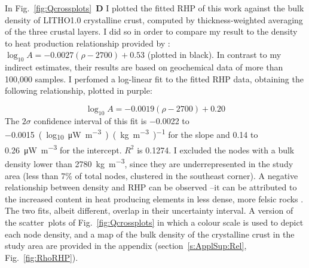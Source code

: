 In Fig.~\ref{fig:Qcrossplots}~\textbf{D} I plotted the fitted RHP of this work against the bulk density of LITHO1.0 \parencite{Pasyanos2014} crystalline crust, computed by thickness-weighted averaging of the three crustal layers.
I did so in order to compare my result to the density to heat production relationship provided by \textcite{Hasterok2017_ign}: $\log_{10} A = -0.0027 (\rho - 2700) + 0.53 $ (plotted in black).
In contrast to my indirect estimates, their results are based on geochemical data of more than {100,000} samples.
I perfomed a log-linear fit to the fitted RHP data, obtaining the following relationship, plotted in purple:

\begin{equation}
	\label{eq:RHP_RHO_fit}
	\log_{10} A = -0.0019 (\rho - 2700) + 0.20
\end{equation}
The $2\sigma$ confidence interval of this fit is \num{-0.0022} to \SI{-0.0015}{(log_{10} \micro \watt \per \cubic \metre)(\kilo \gram \per \cubic \metre)^{-1}} for the slope and \num{0.14} to \SI{0.26}{\micro \watt \per \cubic \metre} for the intercept.
$R^2$ is \num{0.1274}.
I excluded the nodes with a bulk density lower than 2780~\si{\kilo \gram \per \cubic \metre}, since they are underrepresented in the study area (less than 7\% of total nodes, clustered in the southeast corner).
A negative relationship between density and RHP can be observed --it can be attributed to the increased content in heat producing elements in less dense, more felsic rocks \parencite{Hasterok2017_ign}.
The two fits, albeit different, overlap in their uncertainty interval.
A version of the scatter~plots of Fig.~\ref{fig:Qcrossplots} in which a colour scale is used to depict each node density, and a map of the bulk density of the crystalline crust in the study area are provided in the appendix (section~\ref{s:ApplSup:Rel}, Fig.~\ref{fig:RhoRHP}).

